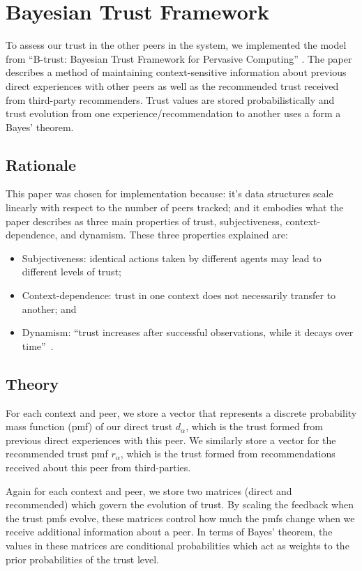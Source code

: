 \section{Bayesian Trust Framework}
To assess our trust in the other peers in the system, we implemented
the model from ``B-trust: Bayesian Trust Framework for Pervasive Computing''
\cite{btrust}. The paper describes a method of maintaining context-sensitive
information about previous direct experiences with other peers as well as
the recommended trust received from third-party recommenders. Trust values
are stored probabilistically and trust evolution from one
experience/recommendation to another uses a form a Bayes' theorem.

\subsection{Rationale}
This paper was chosen for implementation because: it's data structures scale
linearly with respect to the number of peers tracked; and it embodies what
the paper describes as three main properties of trust, subjectiveness,
context-dependence, and dynamism. These three properties explained are:
\begin{itemize}
  \item Subjectiveness: identical actions taken by different agents may lead to
  different levels of trust;
  \item Context-dependence: trust in one context does not necessarily transfer
  to another; and
  \item Dynamism: ``trust increases after successful observations, while it
  decays over time''~\cite{btrust}.
\end{itemize}


\subsection{Theory}
For each context and peer, we store a vector that represents a discrete
probability mass function (pmf) of our direct trust $d_\alpha$, which is the
trust formed from previous direct experiences with this peer. We similarly store a
vector for the recommended trust pmf $r_\alpha$, which is the trust formed from
recommendations received about this peer from third-parties.

Again for each context and peer, we store two matrices (direct and recommended)
which govern the evolution of trust. By scaling the feedback when the trust
pmfs evolve, these matrices control how much the pmfs change when we receive
additional information about a peer. In terms of Bayes' theorem, the
values in these matrices are conditional probabilities which act as weights
to the prior probabilities of the trust level.

